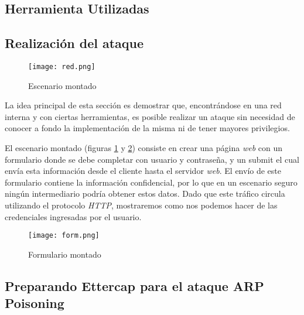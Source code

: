 
\subsection{Herramienta Utilizadas} 
    


\subsection{Realización del ataque}

\begin{center}
    \begin{figure}   
       \begin{center}
         
          \texttt{[image: red.png]}
       \end{center}
       \caption{Escenario montado}
       \label{escMontado}
    \end{figure}
 \end{center}

La idea principal de esta sección es demostrar que, encontrándose en una red interna
y con ciertas herramientas, es posible realizar un ataque 
sin necesidad de conocer a fondo la implementación de la misma ni de tener mayores
privilegios.

El escenario montado (figuras \ref{escMontado} y \ref{formMontado}) consiste en crear una página \emph{web} con un 
formulario donde se debe completar con usuario y contraseña, y un 
submit el cual envía esta información desde el cliente hasta el 
servidor \emph{web}. El envío de este formulario contiene la información confidencial,
 por lo que en un escenario seguro ningún
intermediario podría obtener estos datos. Dado que este tráfico
circula utilizando el protocolo \emph{HTTP}, mostraremos como nos podemos hacer de las credenciales
ingresadas por el usuario.

\begin{center}
   \begin{figure}   
      \begin{center}
         \texttt{[image: form.png]}
      \end{center}
      \caption{Formulario montado}
      \label{formMontado}
   \end{figure}
\end{center}

\subsection{Preparando Ettercap para el ataque ARP Poisoning}

